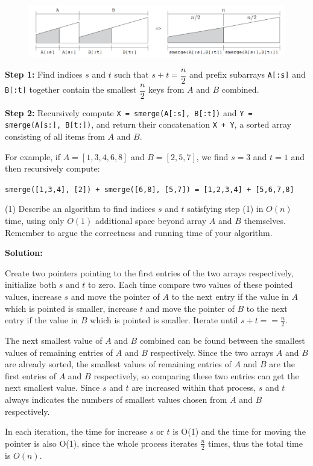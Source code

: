 \documentclass{article}
\begin{document}
\begin{figure}[h]
	\centering
	\includegraphics[width=1\linewidth]{2}
\end{figure}

\textbf{Step 1:} Find indices $s$ and $t$ such that $s+t=\dfrac{n}{2}$ and prefix subarrays \texttt{A[:s]} and \texttt{B[:t]} together contain the smallest $\dfrac{n}{2}$ keys from $A$ and $B$ combined.
 
\textbf{Step 2:} Recursively compute \texttt{X = smerge(A[:s], B[:t])} and \texttt{Y = smerge(A[s:], B[t:])}, and return their concatenation \texttt{X + Y}, a sorted array consisting of all items from $A$ and $B$.
 
 For example, if $A=[1,3,4,6,8]$ and $B=[2,5,7]$, we find $s=3$ and $t=1$ and then recursively compute:
 
 \centerline{\texttt{smerge([1,3,4], [2]) + smerge([6,8], [5,7]) = [1,2,3,4] + [5,6,7,8]}}
 
 (1) Describe an algorithm to find indices $s$ and $t$ satisfying step (1) in $O(n)$ time, using only $O(1)$ additional space beyond array $A$ and $B$ themselves. Remember to argue the correctness and running time of your algorithm.
\par\textbf{Solution:}
\par Create two pointers pointing to the first entries of the two arrays respectively, initialize both $s$ and $t$ to zero. Each time compare two values of these pointed values, increase $s$ and move the pointer of $A$ to the next entry if the value in $A$ which is pointed is smaller, increase $t$ and move the pointer of $B$  to the next entry if the value in $B$ which is pointed is smaller. Iterate until $s + t == \frac{n}{2}$.
\par The next smallest value of $A$ and $B$ combined can be found between the smallest values of remaining entries of $A$ and $B$ respectively. Since the two arrays $A$ and $B$ are already sorted, the smallest values of remaining entries of $A$ and $B$ are the first entries of $A$ and $B$ respectively, so comparing these two entries can get the next smallest value. Since $s$ and $t$ are increased within that process, $s$ and $t$ always indicates the numbers of smallest values chosen from $A$ and $B$ respectively.
\par In each iteration, the time for increase $s$ or $t$ is O(1) and the time for moving the pointer is also O(1), since the whole process iterates $\frac{n}{2}$ times, thus the total time is $O(n)$.
 
\end{document}
